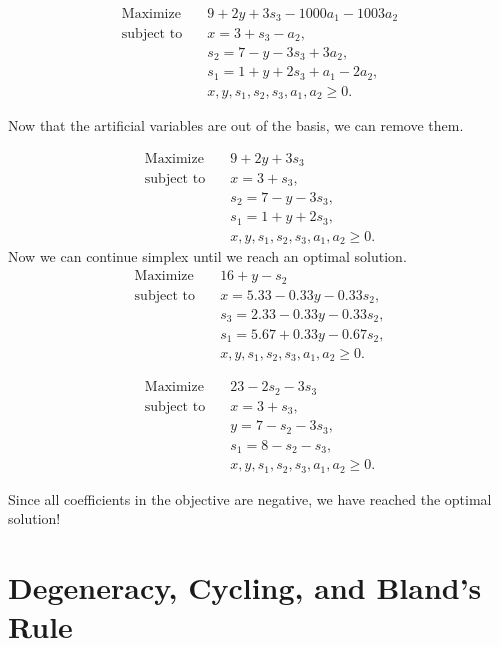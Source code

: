 \[
\begin{aligned}
\text{Maximize}\quad & 9 + 2y + 3s_3 - 1000a_1 - 1003a_2 \\
\text{subject to}\quad 
& x = 3 + s_3 - a_2,\\ 
& s_2 = 7 - y - 3s_3 + 3a_2,\\ 
& s_1 = 1 + y + 2s_3 + a_1 - 2a_2,\\ 
& x, y, s_1, s_2, s_3, a_1, a_2 \ge 0.
\end{aligned}
\]

Now that the artificial variables are out of the basis, we can remove them.

\[
\begin{aligned}
\text{Maximize}\quad & 9 + 2y + 3s_3 \\
\text{subject to}\quad 
& x = 3 + s_3,\\ 
& s_2 = 7 - y - 3s_3,\\ 
& s_1 = 1 + y + 2s_3,\\ 
& x, y, s_1, s_2, s_3, a_1, a_2 \ge 0.
\end{aligned}
\]
Now we can continue simplex until we reach an optimal solution.
\[
\begin{aligned}
\text{Maximize}\quad & 16 + y - s_2 \\
\text{subject to}\quad 
& x = 5.33 - 0.33y - 0.33s_2,\\ 
& s_3 = 2.33 - 0.33y - 0.33s_2,\\ 
& s_1 = 5.67 + 0.33y - 0.67s_2,\\ 
& x, y, s_1, s_2, s_3, a_1, a_2 \ge 0.
\end{aligned}
\]

\[
\begin{aligned}
\text{Maximize}\quad & 23 - 2s_2 - 3s_3 \\
\text{subject to}\quad 
& x = 3 + s_3,\\ 
& y = 7 - s_2 - 3s_3,\\ 
& s_1 = 8 - s_2 - s_3,\\ 
& x, y, s_1, s_2, s_3, a_1, a_2 \ge 0.
\end{aligned}
\]





Since all coefficients in the objective are negative, we have reached the optimal solution!

\section{Degeneracy, Cycling, and Bland's Rule}

